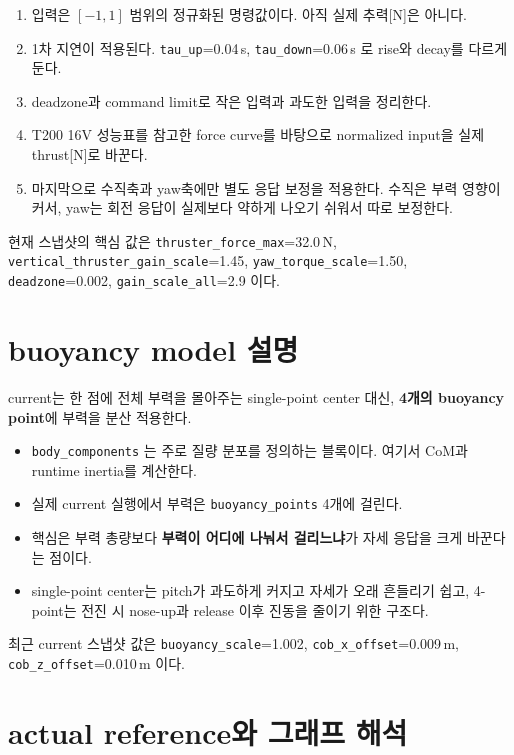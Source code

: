 \documentclass[11pt,a4paper]{article}
\newcommand{\code}[1]{\nolinkurl{#1}}
\begin{document}
\begin{enumerate}[leftmargin=2em]
  \item 입력은 \([-1, 1]\) 범위의 정규화된 명령값이다. 아직 실제 추력[N]은 아니다.
  \item 1차 지연이 적용된다. \code{tau\_up}=0.04\,s, \code{tau\_down}=0.06\,s 로 rise와 decay를 다르게 둔다.
  \item deadzone과 command limit로 작은 입력과 과도한 입력을 정리한다.
  \item T200 16V 성능표를 참고한 force curve를 바탕으로 normalized input을 실제 thrust[N]로 바꾼다.
  \item 마지막으로 수직축과 yaw축에만 별도 응답 보정을 적용한다. 수직은 부력 영향이 커서, yaw는 회전 응답이 실제보다 약하게 나오기 쉬워서 따로 보정한다.
\end{enumerate}

현재 스냅샷의 핵심 값은 \code{thruster\_force\_max}=32.0\,N, \code{vertical\_thruster\_gain\_scale}=1.45, \code{yaw\_torque\_scale}=1.50, \code{deadzone}=0.002, \code{gain\_scale\_all}=2.9 이다.

\section{buoyancy model 설명}

current는 한 점에 전체 부력을 몰아주는 single-point center 대신, \textbf{4개의 buoyancy point}에 부력을 분산 적용한다.

\begin{itemize}[leftmargin=2em]
  \item \code{body\_components} 는 주로 질량 분포를 정의하는 블록이다. 여기서 CoM과 runtime inertia를 계산한다.
  \item 실제 current 실행에서 부력은 \code{buoyancy\_points} 4개에 걸린다.
  \item 핵심은 부력 총량보다 \textbf{부력이 어디에 나눠서 걸리느냐}가 자세 응답을 크게 바꾼다는 점이다.
  \item single-point center는 pitch가 과도하게 커지고 자세가 오래 흔들리기 쉽고, 4-point는 전진 시 nose-up과 release 이후 진동을 줄이기 위한 구조다.
\end{itemize}

최근 current 스냅샷 값은 \code{buoyancy\_scale}=1.002, \code{cob\_x\_offset}=0.009\,m, \code{cob\_z\_offset}=0.010\,m 이다.

\section{actual reference와 그래프 해석}
\end{document}
